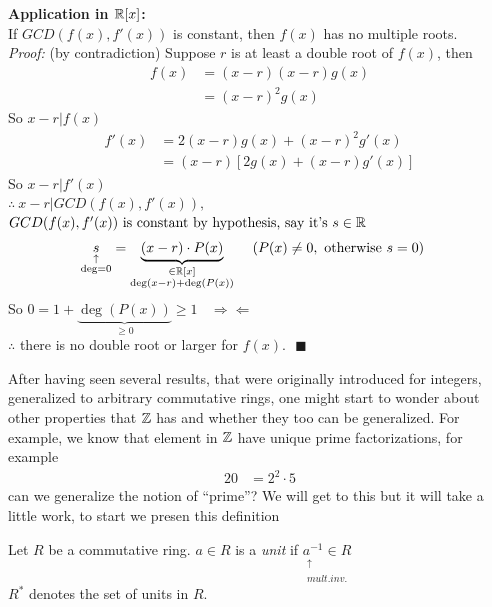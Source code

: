\begin{example}
\textbf{Application in ${\mathbb{ R}}[x]$:} \\
If $GCD(f(x),f'(x))$ is constant, then $f(x)$ has no multiple roots. \\ \steezybreak
\textit{Proof:} (by contradiction)
Suppose $r$ is at least a double root of $f(x)$, then
\begin{align}
    f(x)&= (x-r)(x-r)g(x) \nonumber \\
    &= (x-r)^2 g(x) \nonumber
\end{align}
So $x-r|f(x)$
\begin{align}
    f'(x)&=2(x-r)g(x)+(x-r)^2 g'(x) \nonumber \\
    &= (x-r)[2g(x)+(x-r)g'(x)] \nonumber
\end{align}
So $x-r|f'(x)$ \\
$ \therefore \ x-r| GCD(f(x),f'(x)), $ \\
$GCD(f(x),f'(x))\text{ is constant by hypothesis, say it's }s\in {\mathbb{ R}}$
\begin{align}
    \underset{\substack{\uparrow \\ \deg=0}}{s}&= \underbrace{(x-r)\cdot P(x)}_{\substack{\in {\mathbb{ R}}[x] \\ \deg(x-r)+\deg(P(x))}} \ \ \ \ (P(x)\neq 0, \text{ otherwise } s=0) \nonumber
\end{align}
So $0= 1+ \underbrace{\deg(P(x))}_{\geq 0} \geq 1 \ \ \ \ \Rightarrow \Leftarrow$ \\
$\therefore$ there is no double root or larger for $f(x). \ \ \ \blacksquare$

\end{example}

After having seen several results, that were originally introduced for integers, generalized to arbitrary commutative rings, one might start to wonder about other properties that ${\mathbb{ Z}}$ has and whether they too can be generalized.
For example, we know that element in ${\mathbb{ Z}}$ have unique prime factorizations, for example
\begin{align}
    20&= 2^2\cdot 5 \nonumber
\end{align}
can we generalize the notion of ``prime''? We will get to this but it will take a little work, to start we presen this definition
\begin{definition}
    Let $R$ be a commutative ring. $a\in R$ is a \textit{unit} if $\underset{\substack{\uparrow \ \ \ \ \ \  \ \\ mult. inv.}}{a^{-1}\in R}$ \\ \steezybreak
    $R^*$ denotes the set of units in $R$.
\end{definition}

